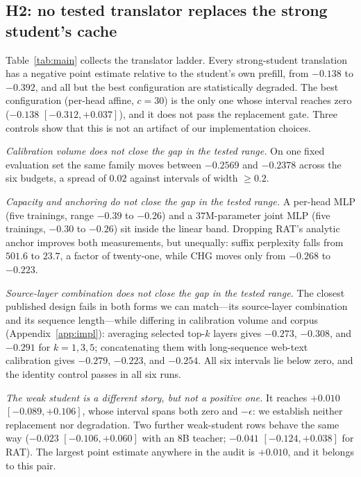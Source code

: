 \documentclass[10pt]{article}
\begin{document}
\subsection{H2: no tested translator replaces the strong student's cache}
\label{sec:h2}
Table~\ref{tab:main} collects the translator ladder. Every strong-student
translation has a negative point estimate relative to the student's own
prefill, from $-0.138$ to $-0.392$, and all but the best configuration are
statistically degraded. The best configuration (per-head affine, $c{=}30$) is
the only one whose interval reaches zero ($-0.138$ $[-0.312,+0.037]$), and it does not
pass the replacement gate.
Three controls show that this is not an artifact of our implementation choices.

\emph{Calibration volume does not close the gap in the tested range.} On one fixed evaluation set the same
family moves between $-0.2569$ and $-0.2378$ across the six budgets, a spread
of $0.02$ against intervals of width $\ge 0.2$.

\emph{Capacity and anchoring do not close the gap in the tested range.} A per-head MLP (five
trainings, range $-0.39$ to $-0.26$) and a $37$M-parameter joint MLP (five
trainings, $-0.30$ to $-0.26$) sit inside the linear band. Dropping RAT's
analytic anchor improves both measurements, but unequally: suffix perplexity
falls from $501.6$ to $23.7$, a factor of twenty-one, while CHG moves only from
$-0.268$ to $-0.223$.

\emph{Source-layer combination does not close the gap in the tested range.} The closest published design
fails in both forms we can match---its source-layer combination and its
sequence length---while differing in calibration volume and corpus
(Appendix~\ref{app:impl}): averaging selected top-$k$ layers gives $-0.273$,
$-0.308$, and $-0.291$ for $k{=}1,3,5$; concatenating them with long-sequence
web-text calibration gives $-0.279$, $-0.223$, and $-0.254$. All six intervals
lie below zero, and the identity control passes in all six runs.

\emph{The weak student is a different story, but not a positive one.} It reaches
$+0.010$ $[-0.089,+0.106]$, whose interval spans both zero and $-\epsilon$: we
establish neither replacement nor degradation. Two further weak-student rows
behave the same way ($-0.023$ $[-0.106,+0.060]$ with an $8$B teacher; $-0.041$
$[-0.124,+0.038]$ for RAT). The largest point estimate anywhere in the audit is
$+0.010$, and it belongs to this pair.
\end{document}
